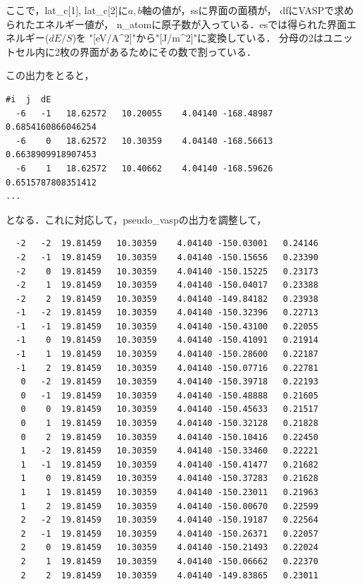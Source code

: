 \documentclass[11pt,dvipdfmx]{jsarticle}
\begin{document}
ここで，lat\_c{[}1{]},
lat\_c{[}2{]}に\(a,b\)軸の値が，ssに界面の面積が，
dfにVASPで求められたエネルギー値が，
n\_atomに原子数が入っている．esでは得られた界面エネルギー(\(dE/S\))を
"{[}eV/A\^{}2{]}"から"{[}J/m\^{}2{]}"に変換している．
分母の2はユニットセル内に2枚の界面があるためにその数で割っている．

この出力をとると，

\begin{verbatim}
#i  j  dE  
  -6   -1   18.62572   10.20055    4.04140 -168.48987 0.6854160866046254
  -6    0   18.62572   10.30359    4.04140 -168.56613 0.6638909918907453
  -6    1   18.62572   10.40662    4.04140 -168.59626 0.6515787808351412
...
\end{verbatim}

となる．これに対応して，pseudo\_vaspの出力を調整して，

\begin{verbatim}
  -2   -2  19.81459   10.30359    4.04140 -150.03001   0.24146     
  -2   -1  19.81459   10.30359    4.04140 -150.15656   0.23390     
  -2    0  19.81459   10.30359    4.04140 -150.15225   0.23173     
  -2    1  19.81459   10.30359    4.04140 -150.04017   0.23388     
  -2    2  19.81459   10.30359    4.04140 -149.84182   0.23938     
  -1   -2  19.81459   10.30359    4.04140 -150.32396   0.22713     
  -1   -1  19.81459   10.30359    4.04140 -150.43100   0.22055     
  -1    0  19.81459   10.30359    4.04140 -150.41091   0.21914     
  -1    1  19.81459   10.30359    4.04140 -150.28600   0.22187     
  -1    2  19.81459   10.30359    4.04140 -150.07716   0.22781     
   0   -2  19.81459   10.30359    4.04140 -150.39718   0.22193     
   0   -1  19.81459   10.30359    4.04140 -150.48888   0.21605     
   0    0  19.81459   10.30359    4.04140 -150.45633   0.21517     
   0    1  19.81459   10.30359    4.04140 -150.32128   0.21828     
   0    2  19.81459   10.30359    4.04140 -150.10416   0.22450     
   1   -2  19.81459   10.30359    4.04140 -150.33460   0.22221     
   1   -1  19.81459   10.30359    4.04140 -150.41477   0.21682     
   1    0  19.81459   10.30359    4.04140 -150.37283   0.21628     
   1    1  19.81459   10.30359    4.04140 -150.23011   0.21963     
   1    2  19.81459   10.30359    4.04140 -150.00670   0.22599     
   2   -2  19.81459   10.30359    4.04140 -150.19187   0.22564     
   2   -1  19.81459   10.30359    4.04140 -150.26371   0.22057     
   2    0  19.81459   10.30359    4.04140 -150.21493   0.22024     
   2    1  19.81459   10.30359    4.04140 -150.06662   0.22370     
   2    2  19.81459   10.30359    4.04140 -149.83865   0.23011
\end{verbatim}
\end{document}

